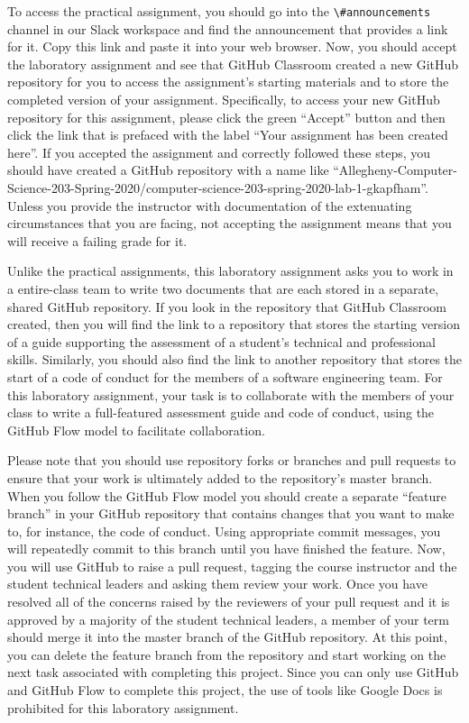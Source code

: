 \documentclass[11pt]{article}
\newcommand{\channel}[1]{\lstinline{#1}}
\begin{document}
To access the practical assignment, you should go into the
\channel{\#announcements} channel in our Slack workspace and find the
announcement that provides a link for it. Copy this link and paste it into your
web browser. Now, you should accept the laboratory assignment and see that
GitHub Classroom created a new GitHub repository for you to access the
assignment's starting materials and to store the completed version of your
assignment. Specifically, to access your new GitHub repository for this
assignment, please click the green ``Accept'' button and then click the link
that is prefaced with the label ``Your assignment has been created here''. If
you accepted the assignment and correctly followed these steps, you should have
created a GitHub repository with a name like
``Allegheny-Computer-Science-203-Spring-2020/computer-science-203-spring-2020-lab-1-gkapfham''.
Unless you provide the instructor with documentation of the extenuating
circumstances that you are facing, not accepting the assignment means that you
will receive a failing grade for it.


Unlike the practical assignments, this laboratory assignment asks you to work in
a entire-class team to write two documents that are each stored in a separate,
shared GitHub repository. If you look in the repository that GitHub Classroom
created, then you will find the link to a repository that stores the starting
version of a guide supporting the assessment of a student's technical and
professional skills. Similarly, you should also find the link to another
repository that stores the start of a code of conduct for the members of a
software engineering team. For this laboratory assignment, your task is to
collaborate with the members of your class to write a full-featured assessment
guide and code of conduct, using the GitHub Flow model to facilitate
collaboration.

Please note that you should use repository forks or branches and pull requests
to ensure that your work is ultimately added to the repository's master branch.
%
When you follow the GitHub Flow model you should create a separate ``feature
branch'' in your GitHub repository that contains changes that you want to make
to, for instance, the code of conduct. Using appropriate commit messages, you
will repeatedly commit to this branch until you have finished the feature. Now,
you will use GitHub to raise a pull request, tagging the course instructor and
the student technical leaders and asking them review your work. Once you have
resolved all of the concerns raised by the reviewers of your pull request and it
is approved by a majority of the student technical leaders, a member of your
term should merge it into the master branch of the GitHub repository. At this
point, you can delete the feature branch from the repository and start working
on the next task associated with completing this project.
%
Since you can only use GitHub and GitHub Flow to complete this project, the use
of tools like Google Docs is prohibited for this laboratory assignment.
\end{document}
